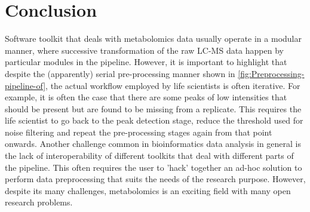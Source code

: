 \section{Conclusion}

Software toolkit that deals with metabolomics data usually operate in a modular manner, where successive transformation of the raw LC-MS data happen by particular modules in the pipeline. However, it is important to highlight that despite the (apparently) serial pre-processing manner shown in \ref{fig:Preprocessing-pipeline-of}, the actual workflow employed by life scientists is often iterative. For example, it is often the case that there are some peaks of low intensities that should be present but are found to be missing from a replicate. This requires the life scientist to go back to the peak detection stage, reduce the threshold used for noise filtering and repeat the pre-processing stages again from that point onwards. Another challenge common in bioinformatics data analysis in general is the lack of interoperability of different toolkits that deal with different parts of the pipeline. This often requires the user to 'hack' together an ad-hoc solution to perform data preprocessing that suits the needs of the research purpose. However, despite its many challenges, metabolomics is an exciting field with many open research problems.